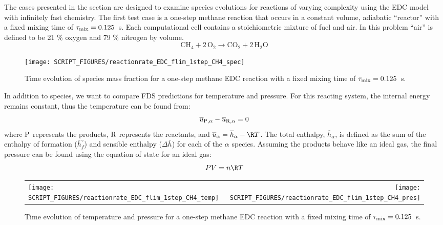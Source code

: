 \documentclass[11pt]{book}
\begin{document}
The cases presented in the section are designed to examine species evolutions for reactions of varying complexity using the EDC model with infinitely fast chemistry. The first test case is a one-step methane reaction that occurs in a constant volume, adiabatic ``reactor'' with a fixed mixing time of $\tau_{\rm mix}=0.125$~s. Each computational cell contains a stoichiometric mixture of fuel and air. In this problem ``air'' is defined to be 21 \% oxygen and 79 \% nitrogen by volume.
\begin{equation}\label{eq:1step_methane}
\mathrm{CH_4 + 2\, O_2 \rightarrow  CO_2 + 2\, H_2O}
\end{equation}

\begin{figure}[!ht]
\centering
\texttt{[image: SCRIPT\_FIGURES/reactionrate\_EDC\_flim\_1step\_CH4\_spec]}
\caption[Species evolution in a 1-step methane EDC reaction]{Time evolution of species mass fraction for a one-step methane EDC reaction with a fixed mixing time of $\tau_{\rm mix}=0.125$~s.}
\label{fig:EDC_1Step_meth_spec}
\end{figure}

In addition to species, we want to compare FDS predictions for temperature and pressure. For this reacting system, the internal energy remains constant, thus the temperature can be found from:
\begin{equation}\label{eq:del_u}
\overline{u}_{{\rm P},\alpha} - \overline{u}_{{\rm R},\alpha} = 0
\end{equation}
where ${\rm P}$ represents the products, ${\rm R}$ represents the reactants, and $\overline{u}_{\alpha}=\overline{h}_{\alpha}-\R T$. The total enthalpy, $\overline{h}_{\alpha}$, is defined as the sum of the enthalpy of formation ($\overline{h}_{f}^{\circ}$) and sensible enthalpy ($\Delta \overline{h}$) for each of the $\alpha$ species. Assuming the products behave like an ideal gas, the final pressure can be found using the equation of state for an ideal gas:
\begin{equation}\label{eq:ideal_gas}
PV = n \R T
\end{equation}
\begin{figure}[!ht]
\begin{tabular*}{\textwidth}{lr}
\texttt{[image: SCRIPT\_FIGURES/reactionrate\_EDC\_flim\_1step\_CH4\_temp]} &
\texttt{[image: SCRIPT\_FIGURES/reactionrate\_EDC\_flim\_1step\_CH4\_pres]}
\end{tabular*}
\caption[Temperature and pressure evolution in a 1-step methane EDC reaction]{Time evolution of temperature and pressure for a one-step methane EDC reaction with a fixed mixing time of $\tau_{\rm mix}=0.125$~s.}
\label{fig:EDC_1Step_meth_temppres}
\end{figure}
\end{document}
